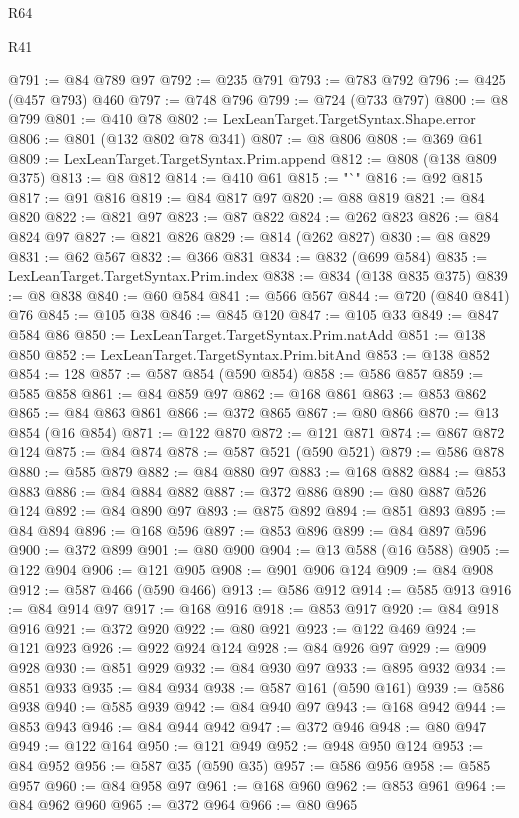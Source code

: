 \begin{lexlean}{R64}
\begin{lexlean}{R41}
\begin{coremodule}
{{{{{{{{{{{{{{{{{{{{{{{{{{{{{{{{{{{{{{{{{{{{{{{{{{{{{{{{{{{{{{{{{{{{{{{{{{{{{{{{{{{{{{{{{@791 := @84 @789 @97
@792 := @235 @791
@793 := @783 @792
@796 := @425 (@457 @793) @460
@797 := @748 @796
@799 := @724 (@733 @797)
@800 := @8 @799
@801 := @410 @78
@802 := LexLeanTarget.TargetSyntax.Shape.error
@806 := @801 (@132 @802 @78 @341)
@807 := @8 @806
@808 := @369 @61
@809 := LexLeanTarget.TargetSyntax.Prim.append
@812 := @808 (@138 @809 @375)
@813 := @8 @812
@814 := @410 @61
@815 := "`"
@816 := @92 @815
@817 := @91 @816
@819 := @84 @817 @97
@820 := @88 @819
@821 := @84 @820
@822 := @821 @97
@823 := @87 @822
@824 := @262 @823
@826 := @84 @824 @97
@827 := @821 @826
@829 := @814 (@262 @827)
@830 := @8 @829
@831 := @62 @567
@832 := @366 @831
@834 := @832 (@699 @584)
@835 := LexLeanTarget.TargetSyntax.Prim.index
@838 := @834 (@138 @835 @375)
@839 := @8 @838
@840 := @60 @584
@841 := @566 @567
@844 := @720 (@840 @841) @76
@845 := @105 @38
@846 := @845 @120
@847 := @105 @33
@849 := @847 @584 @86
@850 := LexLeanTarget.TargetSyntax.Prim.natAdd
@851 := @138 @850
@852 := LexLeanTarget.TargetSyntax.Prim.bitAnd
@853 := @138 @852
@854 := 128
@857 := @587 @854 (@590 @854)
@858 := @586 @857
@859 := @585 @858
@861 := @84 @859 @97
@862 := @168 @861
@863 := @853 @862
@865 := @84 @863 @861
@866 := @372 @865
@867 := @80 @866
@870 := @13 @854 (@16 @854)
@871 := @122 @870
@872 := @121 @871
@874 := @867 @872 @124
@875 := @84 @874
@878 := @587 @521 (@590 @521)
@879 := @586 @878
@880 := @585 @879
@882 := @84 @880 @97
@883 := @168 @882
@884 := @853 @883
@886 := @84 @884 @882
@887 := @372 @886
@890 := @80 @887 @526 @124
@892 := @84 @890 @97
@893 := @875 @892
@894 := @851 @893
@895 := @84 @894
@896 := @168 @596
@897 := @853 @896
@899 := @84 @897 @596
@900 := @372 @899
@901 := @80 @900
@904 := @13 @588 (@16 @588)
@905 := @122 @904
@906 := @121 @905
@908 := @901 @906 @124
@909 := @84 @908
@912 := @587 @466 (@590 @466)
@913 := @586 @912
@914 := @585 @913
@916 := @84 @914 @97
@917 := @168 @916
@918 := @853 @917
@920 := @84 @918 @916
@921 := @372 @920
@922 := @80 @921
@923 := @122 @469
@924 := @121 @923
@926 := @922 @924 @124
@928 := @84 @926 @97
@929 := @909 @928
@930 := @851 @929
@932 := @84 @930 @97
@933 := @895 @932
@934 := @851 @933
@935 := @84 @934
@938 := @587 @161 (@590 @161)
@939 := @586 @938
@940 := @585 @939
@942 := @84 @940 @97
@943 := @168 @942
@944 := @853 @943
@946 := @84 @944 @942
@947 := @372 @946
@948 := @80 @947
@949 := @122 @164
@950 := @121 @949
@952 := @948 @950 @124
@953 := @84 @952
@956 := @587 @35 (@590 @35)
@957 := @586 @956
@958 := @585 @957
@960 := @84 @958 @97
@961 := @168 @960
@962 := @853 @961
@964 := @84 @962 @960
@965 := @372 @964
@966 := @80 @965
}}}}}}}}}}}}}}}}}}}}}}}}}}}}}}}}}}}}}}}}}}}}}}}}}}}}}}}}}}}}}}}}}}}}}}}}}}}}}}}}}}}}}}}}}
\end{coremodule}
\end{lexlean}
\end{lexlean}
